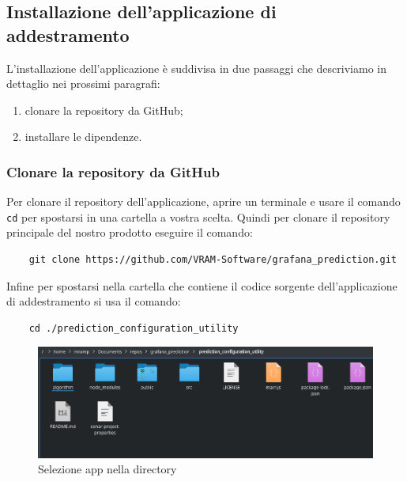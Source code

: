 \subsection{Installazione dell'applicazione di addestramento}
L'installazione dell'applicazione è suddivisa in due passaggi che descriviamo in dettaglio nei prossimi paragrafi:
\begin{enumerate}
    \item clonare la repository da GitHub;
    \item installare le dipendenze.
\end{enumerate}

\subsubsection{Clonare la repository da GitHub}%
Per clonare il repository dell'applicazione, aprire un terminale e usare il comando \texttt{cd} per spostarsi in una cartella a vostra scelta. Quindi per clonare il repository principale del nostro prodotto eseguire il comando:
\begin{verbatim}
	git clone https://github.com/VRAM-Software/grafana_prediction.git
\end{verbatim}
Infine per spostarsi nella cartella che contiene il codice sorgente dell'applicazione di addestramento si usa il comando:
\begin{verbatim}
	cd ./prediction_configuration_utility
\end{verbatim}

\begin{figure}[H] 	
	\begin{center}
		\includegraphics[width=\textwidth,height=\textheight,keepaspectratio]{img/directoryProject.png}
	\end{center}
	\caption{Selezione app nella directory}	
\end{figure}



